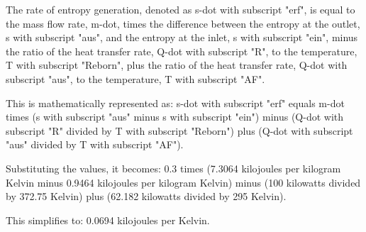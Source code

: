 The rate of entropy generation, denoted as s-dot with subscript "erf", is equal to the mass flow rate, m-dot, times the difference between the entropy at the outlet, s with subscript "aus", and the entropy at the inlet, s with subscript "ein", minus the ratio of the heat transfer rate, Q-dot with subscript "R", to the temperature, T with subscript "Reborn", plus the ratio of the heat transfer rate, Q-dot with subscript "aus", to the temperature, T with subscript "AF".

This is mathematically represented as:
s-dot with subscript "erf" equals m-dot times (s with subscript "aus" minus s with subscript "ein") minus (Q-dot with subscript "R" divided by T with subscript "Reborn") plus (Q-dot with subscript "aus" divided by T with subscript "AF").

Substituting the values, it becomes:
0.3 times (7.3064 kilojoules per kilogram Kelvin minus 0.9464 kilojoules per kilogram Kelvin) minus (100 kilowatts divided by 372.75 Kelvin) plus (62.182 kilowatts divided by 295 Kelvin).

This simplifies to:
0.0694 kilojoules per Kelvin.